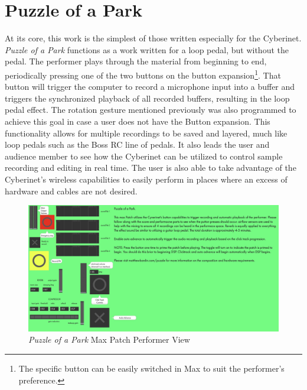 \section{Puzzle of a Park}
At its core, this work is the simplest of those written especially for the Cyberinet. \textit{Puzzle of a Park} functions as a work written for a loop pedal, but without the pedal. The performer plays through the material from beginning to end, periodically pressing one of the two buttons on the button expansion\footnote{The specific button can be easily switched in Max to suit the performer's preference.}. That button will trigger the computer to record a microphone input into a buffer and triggers the synchronized playback of all recorded buffers, resulting in the loop pedal effect. The rotation gesture mentioned previously was also programmed to achieve this goal in case a user does not have the Button expansion. This functionality allows for multiple recordings to be saved and layered, much like loop pedals such as the Boss RC line of pedals. It also leads the user and audience member to see how the Cyberinet can be utilized to control sample recording and editing in real time. The user is also able to take advantage of the Cyberinet's wireless capabilities to easily perform in places where an excess of hardware and cables are not desired.

\begin{figure}
    \centering
    \includegraphics[scale=0.2]{diagrams/maxPatches/puzzlePresentation.jpg}
    \caption{\textit{Puzzle of a Park} Max Patch Performer View}
    \label{fig:puzzlePatchPres}
\end{figure}

